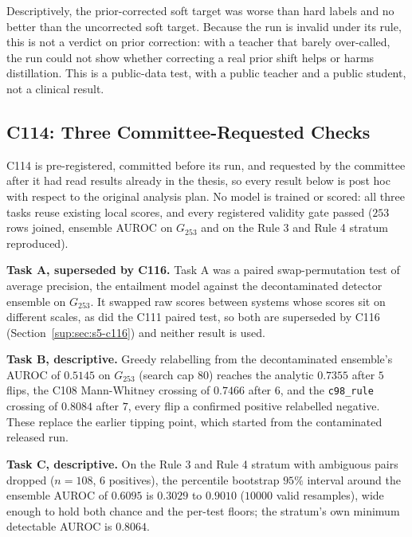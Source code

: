 Descriptively, the prior-corrected soft target was worse than hard labels and no better than the
uncorrected soft target. Because the run is invalid under its rule, this is not a verdict on prior
correction: with a teacher that barely over-called, the run could not show whether correcting a
real prior shift helps or harms distillation. This is a public-data test, with a public teacher
and a public student, not a clinical result.

\subsection{C114: Three Committee-Requested Checks}
\label{sup:sec:s5-c114}

C114 is pre-registered, committed before its run, and requested by the committee after it had read
results already in the thesis, so every result below is post hoc with respect to the original
analysis plan. No model is trained or scored: all three tasks reuse existing local scores, and every
registered validity gate passed ($253$ rows joined, ensemble AUROC on $G_{253}$ and on the Rule 3
and Rule 4 stratum reproduced).

\textbf{Task A, superseded by C116.} Task A was a paired swap-permutation test of average
precision, the entailment model against the decontaminated detector ensemble on $G_{253}$. It
swapped raw scores between systems whose scores sit on different scales, as did the C111 paired
test, so both are superseded by C116 (Section~\ref{sup:sec:s5-c116}) and neither result is used.

\textbf{Task B, descriptive.} Greedy relabelling from the decontaminated ensemble's AUROC of
$0.5145$ on $G_{253}$ (search cap $80$) reaches the analytic $0.7355$ after $5$ flips, the C108
Mann-Whitney crossing of $0.7466$ after $6$, and the \texttt{c98\_rule} crossing of $0.8084$ after
$7$, every flip a confirmed positive relabelled negative. These replace the earlier tipping point,
which started from the contaminated released run.

\textbf{Task C, descriptive.} On the Rule 3 and Rule 4 stratum with ambiguous pairs dropped
($n = 108$, $6$ positives), the percentile bootstrap $95\%$ interval around the ensemble AUROC of
$0.6095$ is $0.3029$ to $0.9010$ ($10000$ valid resamples), wide enough to hold both chance and the
per-test floors; the stratum's own minimum detectable AUROC is $0.8064$.

